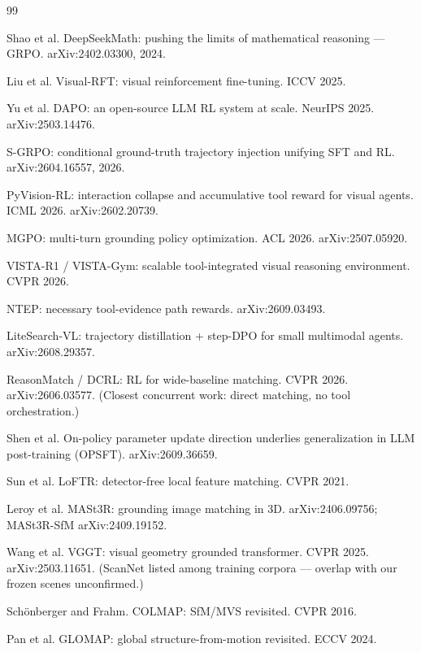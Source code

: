 \documentclass[10pt,twocolumn,letterpaper]{article}
\begin{document}
\begin{thebibliography}{99}\small

 Shao et al. DeepSeekMath: pushing the limits of
mathematical reasoning — GRPO. arXiv:2402.03300, 2024.

 Liu et al. Visual-RFT: visual reinforcement
fine-tuning. ICCV 2025.

 Yu et al. DAPO: an open-source LLM RL system at scale.
NeurIPS 2025. arXiv:2503.14476.

 S-GRPO: conditional ground-truth trajectory injection
unifying SFT and RL. arXiv:2604.16557, 2026.

 PyVision-RL: interaction collapse and accumulative
tool reward for visual agents. ICML 2026. arXiv:2602.20739.

 MGPO: multi-turn grounding policy optimization. ACL 2026.
arXiv:2507.05920.

 VISTA-R1 / VISTA-Gym: scalable tool-integrated visual
reasoning environment. CVPR 2026.

 NTEP: necessary tool-evidence path rewards. arXiv:2609.03493.

 LiteSearch-VL: trajectory distillation + step-DPO for
small multimodal agents. arXiv:2608.29357.

 ReasonMatch / DCRL: RL for wide-baseline matching.
CVPR 2026. arXiv:2606.03577. (Closest concurrent work: direct matching,
no tool orchestration.)

 Shen et al. On-policy parameter update direction underlies
generalization in LLM post-training (OPSFT). arXiv:2609.36659.

 Sun et al. LoFTR: detector-free local feature matching.
CVPR 2021.

 Leroy et al. MASt3R: grounding image matching in 3D.
arXiv:2406.09756; MASt3R-SfM arXiv:2409.19152.

 Wang et al. VGGT: visual geometry grounded transformer.
CVPR 2025. arXiv:2503.11651. (ScanNet listed among training corpora —
overlap with our frozen scenes unconfirmed.)

 Sch\"onberger and Frahm. COLMAP: SfM/MVS revisited. CVPR
2016.

 Pan et al. GLOMAP: global structure-from-motion
revisited. ECCV 2024.


\end{thebibliography}
\end{document}
